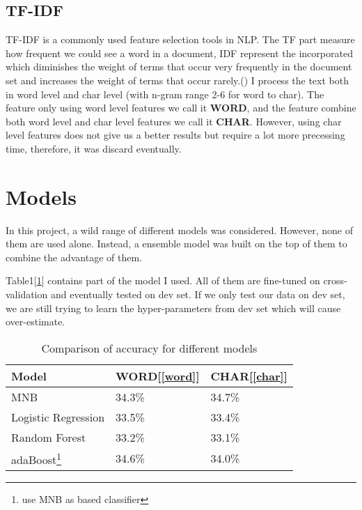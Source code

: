 \documentclass[11pt]{article}
\begin{document}
\subsection{TF-IDF}
TF-IDF is a commonly used feature selection tools in NLP.
The TF part measure how frequent we could see a word in a document, 
IDF represent the incorporated which diminishes the weight of terms that 
occur very frequently in the document set and increases the 
weight of terms that occur rarely.()
I process the text both in word level
and char level (with n-gram range 2-6 for word to char).
The feature only using word level features we call it \textbf{WORD}\label{word}, 
and the feature combine both word level
and char level features we call it \textbf{CHAR}\label{char}.
However, using char level features does not give us a better results 
but require a lot more precessing time, therefore, it was discard eventually.

\section{Models}
\label{models}
In this project, a wild range of different models was considered. However, none of them are used 
alone. Instead, a ensemble model was built on the top of them to combine the advantage of them.

Table1[\ref{accuracy}] contains part of the model I used. All of them are fine-tuned on 
cross-validation and eventually tested on dev set. If 
we only test our data on dev set, we are still trying to learn the
hyper-parameters from dev set which will cause over-estimate.

\begin{table}[h]
  \begin{center}
 \begin{tabular}{|l|l|l|}
 
       \hline
       Model & WORD[\ref{word}] & CHAR[\ref{char}]\\
       \hline\hline
       MNB & 34.3\% & 34.7\% \\
       Logistic Regression & 33.5\% & 33.4\% \\
       Random Forest & 33.2\% & 33.1\% \\
       adaBoost\footnote{use MNB as based classifier} & 34.6\% & 34.0\% \\
       \hline
 
 \end{tabular}
 \caption{Comparison of accuracy for different models}\label{accuracy}
  \end{center}
 \end{table}
\end{document}
